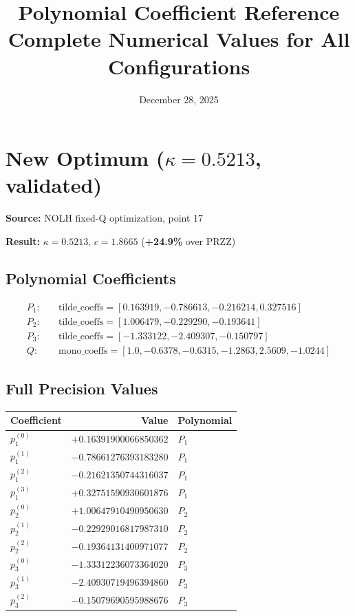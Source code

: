 \documentclass[11pt]{article}
\title{Polynomial Coefficient Reference\\
\large Complete Numerical Values for All Configurations}
\author{}
\date{December 28, 2025}
\begin{document}
\maketitle

\section{New Optimum ($\kappa = 0.5213$, validated)}

\textbf{Source:} NOLH fixed-Q optimization, point 17

\textbf{Result:} $\kappa = 0.5213$, $c = 1.8665$ (\textcolor{improvement}{\textbf{+24.9\%}} over PRZZ)

\subsection{Polynomial Coefficients}

\begin{align*}
P_1: \quad & \text{tilde\_coeffs} = [0.163919, -0.786613, -0.216214, 0.327516] \\
P_2: \quad & \text{tilde\_coeffs} = [1.006479, -0.229290, -0.193641] \\
P_3: \quad & \text{tilde\_coeffs} = [-1.333122, -2.409307, -0.150797] \\
Q: \quad & \text{mono\_coeffs} = [1.0, -0.6378, -0.6315, -1.2863, 2.5609, -1.0244]
\end{align*}

\subsection{Full Precision Values}

\begin{center}
\begin{tabular}{lrl}
\toprule
Coefficient & Value & Polynomial \\
\midrule
$p_1^{(0)}$ & $+0.16391900066850362$ & $P_1$ \\
$p_1^{(1)}$ & $-0.78661276393183280$ & $P_1$ \\
$p_1^{(2)}$ & $-0.21621350744316037$ & $P_1$ \\
$p_1^{(3)}$ & $+0.32751590930601876$ & $P_1$ \\
\midrule
$p_2^{(0)}$ & $+1.00647910490950630$ & $P_2$ \\
$p_2^{(1)}$ & $-0.22929016817987310$ & $P_2$ \\
$p_2^{(2)}$ & $-0.19364131400971077$ & $P_2$ \\
\midrule
$p_3^{(0)}$ & $-1.33312236073364020$ & $P_3$ \\
$p_3^{(1)}$ & $-2.40930719496394860$ & $P_3$ \\
$p_3^{(2)}$ & $-0.15079690595988676$ & $P_3$ \\
\bottomrule
\end{tabular}
\end{center}
\end{document}

